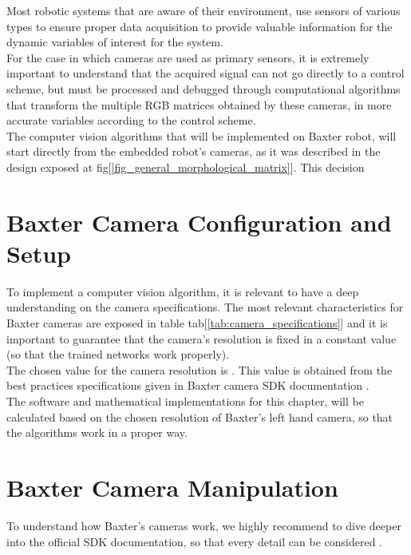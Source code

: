 \documentclass[11pt]{report} %
\begin{document}
Most robotic systems that are aware of their environment, use sensors of various types to ensure proper data acquisition to provide valuable information for the dynamic variables of interest for the system.\\

For the case in which cameras are used as primary sensors, it is extremely important to understand that the acquired signal can not go directly to a control scheme, but must be processed and debugged through computational algorithms that transform the multiple RGB matrices obtained by these cameras, in more accurate variables according to the control scheme.\\

The computer vision algorithms that will be implemented on Baxter robot, will start directly from the embedded robot's cameras, as it was described in the design exposed at fig[\ref{fig_general_morphological_matrix}]. This decision

\section{Baxter Camera Configuration and Setup}

To implement a computer vision algorithm, it is relevant to have a deep understanding on the camera specifications. The most relevant characteristics for Baxter cameras are exposed in table tab[\ref{tab:camera_specifications}] and it is important to guarantee that the camera's resolution is fixed in a constant value (so that the trained networks work properly).\\

The chosen value for the camera resolution is . This value is obtained from the best practices specifications given in Baxter camera SDK documentation \citep{cite_baxter_hardware_specifications}.\\

The software and mathematical implementations for this chapter, will be calculated based on the chosen resolution of Baxter's left hand camera, so that the algorithms work in a proper way.\\

\section{Baxter Camera Manipulation}

To understand how Baxter's cameras work, we highly recommend to dive deeper into the official SDK documentation, so that every detail can be considered \citep{cite_baxter_cameras_wiki}.\\
\end{document}
